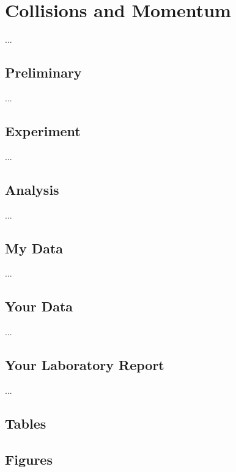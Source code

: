 \setcounter{chapter}{9}
\chapter{Collisions and Momentum}
...
\section{Preliminary}
...
\section{Experiment}
...
\section{Analysis}
...
\section{My Data}
...
\section{Your Data}
...
\newpage
\section{Your Laboratory Report}
...
\newpage
\section{Tables}
\FloatBarrier
\newpage
\section{Figures}
